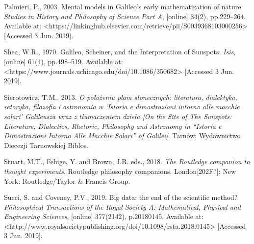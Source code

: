 \documentclass[a4paper]{article}
\begin{document}
Palmieri, P., 2003. Mental models in Galileo’s early mathematization of nature. \textit{Studies in History and
Philosophy of Science Part A}, [online] 34(2), pp.229–264. Available at:
{\textless}https://linkinghub.elsevier.com/retrieve/pii/S0039368103000256{\textgreater} [Accessed 3 Jun. 2019].

Shea, W.R., 1970. Galileo, Scheiner, and the Interpretation of Sunspots. \textit{Isis}, [online] 61(4), pp.498–519.
Available at: {\textless}https://www.journals.uchicago.edu/doi/10.1086/350682{\textgreater} [Accessed 3 Jun. 2019].

Sierotowicz, T.M., 2013. \textit{O położeniu plam słonecznych: literatura, dialektyka, retoryka, filozofia i astronomia
w ‘Istoria e dimostrazioni intorno alle macchie solari’ Galileusza wraz z tłumaczeniem dzieła [On the Site of The
Sunspots: Literature, Dialectics, Rhetoric, Philosophy and Astronomy in “Istoria e Dimostrazioni Intorno Alle Macchie
Solari” of Galilei]}. Tarnów: Wydawnictwo Diecezji Tarnowskiej Biblos.

Stuart, M.T., Fehige, Y. and Brown, J.R. eds., 2018. \textit{The Routledge companion to thought experiments}. Routledge
philosophy companions. London[202F?]; New York: Routledge/Taylor \& Francis Group.

Succi, S. and Coveney, P.V., 2019. Big data: the end of the scientific method? \textit{Philosophical Transactions of the
Royal Society A: Mathematical, Physical and Engineering Sciences}, [online] 377(2142), p.20180145. Available at:
{\textless}http://www.royalsocietypublishing.org/doi/10.1098/rsta.2018.0145{\textgreater} [Accessed 3 Jun. 2019].
\end{document}
